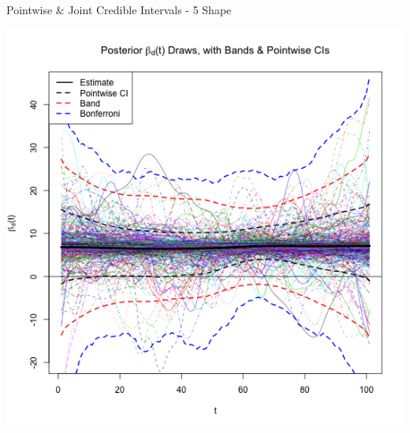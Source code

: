 \documentclass[9 pt]{beamer}
\begin{document}
\begin{frame}{Pointwise \& Joint Credible Intervals - 5 Shape}

\begin{center}

\includegraphics[scale=.37]{pics/Figure_Bands_5_Shape_12-19-12_bonf.png}

\end{center}
\end{frame}
\end{document}
